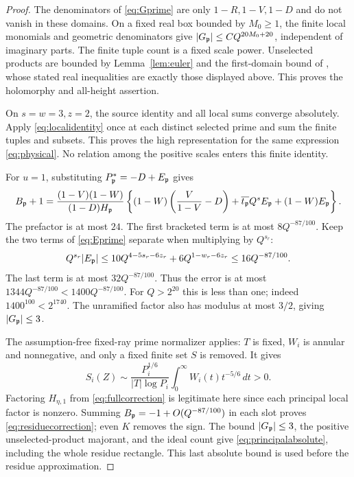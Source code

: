\begin{proof}
The denominators of \eqref{eq:Gprime} are only $1-R,1-V,1-D$ and do not vanish in these domains. On a fixed real box bounded by $M_0\ge1$, the finite local monomials and geometric denominators give $|G_\mathfrak p|\le C Q^{20M_0+20}$, independent of imaginary parts. The finite tuple count is a fixed scale power. Unselected products are bounded by Lemma~\ref{lem:euler} and the first-domain bound of , whose stated real inequalities are exactly those displayed above. This proves the holomorphy and all-height assertion.

On $s=w=3,z=2$, the source identity  and all local sums converge absolutely. Apply \eqref{eq:localidentity} once at each distinct selected prime and sum the finite tuples and subsets. This proves the high representation for the same expression \eqref{eq:physical}. No relation among the positive scales enters this finite identity.

For $u=1$, substituting $P_\mathfrak p^*=-D+E_\mathfrak p$ gives
\[
 B_\mathfrak p+1=\frac{(1-V)(1-W)}{(1-D)H_\mathfrak p}
 \left\{(1-W)\left(\frac V{1-V}-D\right)
       +\overline{t_\mathfrak p}Q^sE_\mathfrak p+(1-W)E_\mathfrak p\right\}.
\]
The prefactor is at most $24$. The first bracketed term is at most $8Q^{-87/100}$. Keep the two terms of \eqref{eq:Eprime} separate when multiplying by $Q^{s_r}$:
\[
 Q^{s_r}|E_\mathfrak p|\le10Q^{4-5s_r-6z_r}+6Q^{1-w_r-6z_r}
 \le16Q^{-87/100}.
\]
The last term is at most $32Q^{-87/100}$. Thus the error is at most $1344Q^{-87/100}<1400Q^{-87/100}$. For $Q>2^{20}$ this is less than one; indeed $1400^{100}<2^{1740}$. The unramified factor also has modulus at most $3/2$, giving $|G_\mathfrak p|\le3$.

The assumption-free fixed-ray prime normalizer  applies: $T$ is fixed, $W_i$ is annular and nonnegative, and only a fixed finite set $S$ is removed. It gives
\[
 S_i(Z)\sim\frac{P_i^{1/6}}{|T|\log P_i}
                 \int_0^\infty W_i(t)t^{-5/6}\,dt>0.
\]
Factoring $H_{\eta,1}$ from \eqref{eq:fullcorrection} is legitimate here since each principal local factor is nonzero. Summing $B_\mathfrak p=-1+O(Q^{-87/100})$ in each slot proves \eqref{eq:residuecorrection}; even $K$ removes the sign. The bound $|G_\mathfrak p|\le3$, the positive unselected-product majorant, and the ideal count give \eqref{eq:principalabsolute}, including the whole residue rectangle. This last absolute bound is used before the residue approximation.
\end{proof}

